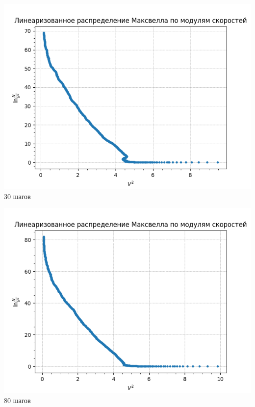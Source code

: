 \begin{minipage}{0.47\textwidth}
    \begin{center}
        \includegraphics[width=\linewidth]{30.png}\\
        30 шагов
    \end{center}
\end{minipage}
\begin{minipage}{0.47\textwidth}
    \begin{center}
        \includegraphics[width=\linewidth]{80.png}\\
        80 шагов
    \end{center}
\end{minipage}

